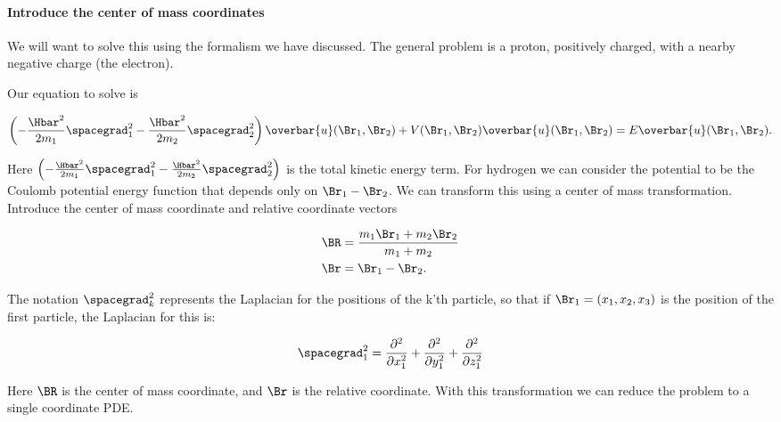 %
%

\paragraph{Introduce the center of mass coordinates}

We will want to solve this using the formalism we have discussed.  The general problem is a proton, positively charged, with a nearby negative charge (the electron).

Our equation to solve is

\begin{align}\label{eqn:PHY356Lecture10:50}
\left(
-\frac{\Hbar^2}{2 m_1} \spacegrad_1^2
-\frac{\Hbar^2}{2 m_2} \spacegrad_2^2
\right)
\overbar{u}(\Br_1, \Br_2) +
V(\Br_1, \Br_2)
\overbar{u}(\Br_1, \Br_2)
=
E \overbar{u}(\Br_1, \Br_2).
\end{align}

Here \(\left( -\frac{\Hbar^2}{2 m_1} \spacegrad_1^2 -\frac{\Hbar^2}{2 m_2} \spacegrad_2^2 \right)\) is the total kinetic energy term.
For hydrogen we can consider the potential to be the Coulomb potential energy function that depends only on \(\Br_1 - \Br_2\).  We can transform this using a center of mass transformation.  Introduce the center of mass coordinate and relative coordinate vectors

\begin{align}\label{eqn:PHY356Lecture10:51}
\BR &= \frac{m_1 \Br_1 + m_2 \Br_2}{ m_1 + m_2 } \\
\Br &= \Br_1 - \Br_2.
\end{align}

The notation \(\spacegrad_k^2\) represents the Laplacian for the positions of the k'th particle, so that if \(\Br_1 = (x_1, x_2, x_3)\) is the position of the first particle, the Laplacian for this is:

\begin{equation}\label{eqn:PHY356FLecture10:52}
\spacegrad_1^2
=
\frac{\partial^2}{\partial x_1^2}
+\frac{\partial^2}{\partial y_1^2}
+\frac{\partial^2}{\partial z_1^2}
\end{equation}

Here \(\BR\) is the center of mass coordinate, and \(\Br\) is the relative coordinate.  With this transformation we can reduce the problem to a single coordinate PDE.

